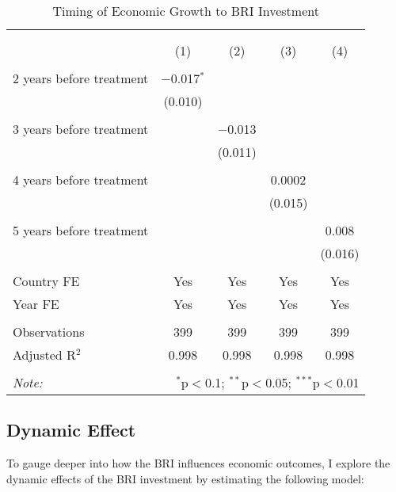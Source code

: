 \documentclass[10pt,a4paper]{article}
\begin{document}
\begin{table}[!htbp] \centering
  \caption{{Timing of Economic Growth to BRI Investment}}
  \label{tab:timing}
\begin{tabular}{@{\extracolsep{5pt}}lcccc}
\\[-1.8ex]\hline
\hline \\[-1.8ex]
\\[-1.8ex] & (1) & (2) & (3) & (4)\\
\hline \\[-1.8ex]
 2 years before treatment & $-$0.017$^{*}$ &  &  &  \\
  & (0.010) &  &  &  \\
  & & & & \\
 3 years before treatment &  & $-$0.013 &  &  \\
  &  & (0.011) &  &  \\
  & & & & \\
 4 years before treatment &  &  & 0.0002 &  \\
  &  &  & (0.015) &  \\
  & & & & \\
 5 years before treatment &  &  &  & 0.008 \\
  &  &  &  & (0.016) \\
  & & & & \\

Country FE & Yes & Yes & Yes & Yes \\
Year FE & Yes & Yes & Yes & Yes \\

\hline \\[-1.8ex]
Observations & 399 & 399 & 399 & 399 \\
Adjusted R$^{2}$ & 0.998 & 0.998 & 0.998 & 0.998 \\
\hline
\hline \\[-1.8ex]
\textit{Note:}  & \multicolumn{4}{r}{$^{*}$p$<$0.1; $^{**}$p$<$0.05; $^{***}$p$<$0.01} \\
\end{tabular}
\end{table}

\subsection{Dynamic Effect}

{\label{817671}}

To gauge deeper into how the BRI influences economic outcomes, I explore
the dynamic effects of the BRI investment by estimating the following
model:
\end{document}
